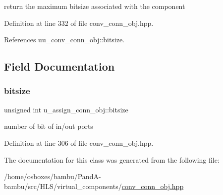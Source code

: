 return the maximum bitsize associated with the component 



Definition at line 332 of file conv\+\_\+conn\+\_\+obj.\+hpp.



References uu\+\_\+conv\+\_\+conn\+\_\+obj\+::bitsize.



\subsection{Field Documentation}
\mbox{\label{classu__assign__conn__obj_a8c73ef69b57d4feacbe4360b313e3352}} 
\subsubsection{\texorpdfstring{bitsize}{bitsize}}
{\footnotesize\ttfamily unsigned int u\+\_\+assign\+\_\+conn\+\_\+obj\+::bitsize\hspace{0.3cm}{\ttfamily [private]}}



number of bit of in/out ports 



Definition at line 306 of file conv\+\_\+conn\+\_\+obj.\+hpp.



The documentation for this class was generated from the following file\+:\begin{DoxyCompactItemize}
\item 
/home/osboxes/bambu/\+Pand\+A-\/bambu/src/\+H\+L\+S/virtual\+\_\+components/\hyperlink{conv__conn__obj_8hpp}{conv\+\_\+conn\+\_\+obj.\+hpp}\end{DoxyCompactItemize}
